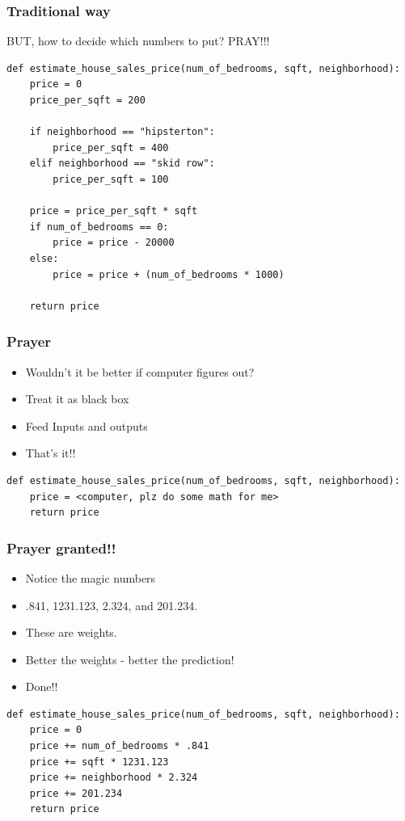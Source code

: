 \begin{frame}[fragile]\frametitle{Traditional way}
BUT, how to decide which numbers to put? PRAY!!!

\begin{lstlisting}
def estimate_house_sales_price(num_of_bedrooms, sqft, neighborhood):
	price = 0
	price_per_sqft = 200

 	if neighborhood == "hipsterton": 
 		price_per_sqft = 400
	elif neighborhood == "skid row": 
		price_per_sqft = 100
	
	price = price_per_sqft * sqft
	if num_of_bedrooms == 0: 
		price = price - 20000
	else: 
		price = price + (num_of_bedrooms * 1000)
    
	return price
\end{lstlisting}
\end{frame}

\begin{frame}[fragile]\frametitle{Prayer}
	\begin{itemize}
	\item Wouldn't it be better if computer figures out? 
	\item Treat it as black box
	\item Feed Inputs and outputs
	\item That's it!!
	\end{itemize}
\begin{lstlisting}
def estimate_house_sales_price(num_of_bedrooms, sqft, neighborhood):
    price = <computer, plz do some math for me>
    return price
\end{lstlisting}
\end{frame}


\begin{frame}[fragile]\frametitle{Prayer granted!!}

	\begin{itemize}
	\item Notice the magic numbers
	\item .841, 1231.123, 2.324, and 201.234. 
	\item These are weights. 
	\item Better the weights - better the prediction!
	\item Done!!
	\end{itemize}
	
\begin{lstlisting}
def estimate_house_sales_price(num_of_bedrooms, sqft, neighborhood):
	price = 0
	price += num_of_bedrooms * .841
	price += sqft * 1231.123
	price += neighborhood * 2.324
	price += 201.234
	return price
\end{lstlisting}	
\end{frame}

